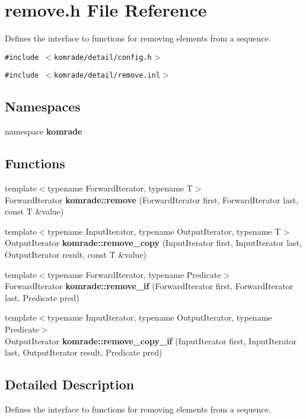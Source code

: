 \section{remove.h File Reference}
\label{remove_8h}
Defines the interface to functions for removing elements from a sequence. 

{\tt \#include $<$komrade/detail/config.h$>$}\par
{\tt \#include $<$komrade/detail/remove.inl$>$}\par
\subsection*{Namespaces}
\begin{CompactItemize}
\item 
namespace {\bf komrade}
\end{CompactItemize}
\subsection*{Functions}
\begin{CompactItemize}
\item 
{\footnotesize template$<$typename ForwardIterator, typename T$>$ }\\ForwardIterator {\bf komrade::remove} (ForwardIterator first, ForwardIterator last, const T \&value)
\item 
{\footnotesize template$<$typename InputIterator, typename OutputIterator, typename T$>$ }\\OutputIterator {\bf komrade::remove\_\-copy} (InputIterator first, InputIterator last, OutputIterator result, const T \&value)
\item 
{\footnotesize template$<$typename ForwardIterator, typename Predicate$>$ }\\ForwardIterator {\bf komrade::remove\_\-if} (ForwardIterator first, ForwardIterator last, Predicate pred)
\item 
{\footnotesize template$<$typename InputIterator, typename OutputIterator, typename Predicate$>$ }\\OutputIterator {\bf komrade::remove\_\-copy\_\-if} (InputIterator first, InputIterator last, OutputIterator result, Predicate pred)
\end{CompactItemize}


\subsection{Detailed Description}
Defines the interface to functions for removing elements from a sequence. 


